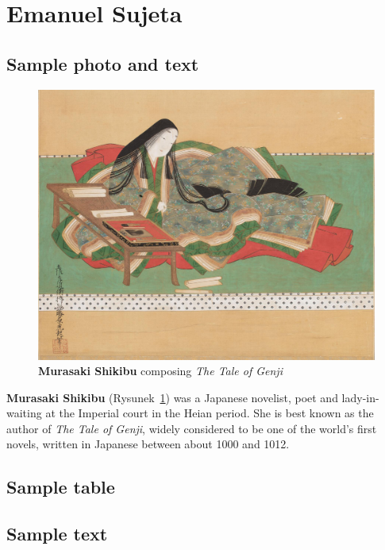 \section{Emanuel Sujeta}

\subsection{Sample photo and text}

\begin{figure}[htpb] %
    \centering
    \includegraphics[width=1\textwidth]{pictures/Murasaki-Shikibu.png}
    \caption{\textbf{Murasaki Shikibu} composing \emph{The Tale of Genji}}
    \label{fig:murasaki}
\end{figure}

\textbf{Murasaki Shikibu} (Rysunek~\ref{fig:murasaki}) was a Japanese novelist, poet and lady-in-waiting at the Imperial court in the Heian period. She is best known as the author of \emph{The Tale of Genji}, widely considered to be one of the world's first novels, written in Japanese between about 1000 and 1012.

\subsection{Sample table}



\subsection{Sample text}

